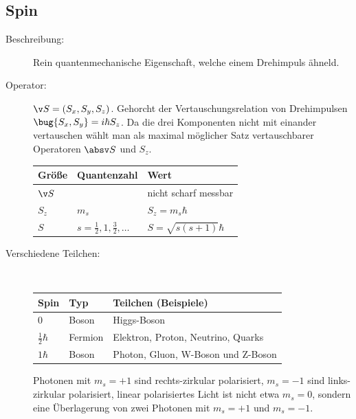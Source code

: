 \documentclass[twocolumn]{summery_4.1}
\begin{document}
\subsection{Spin}
\begin{description}
    \item[Beschreibung:] Rein quantenmechanische Eigenschaft, welche einem Drehimpuls ähneld. 
    \item[Operator:] \(\v S = (S_x,S_y,S_z)\). Gehorcht der Vertauschungsrelation von Drehimpulsen \(\bug{S_x,S_y} = i\hbar S_z \). Da die drei Komponenten nicht mit einander vertauschen wählt man als maximal möglicher Satz vertauschbarer Operatoren \(\absv S\) und \(S_z\).
    
    \begin{center}
        \begin{tabular}{@{}lll@{}}
            \toprule
            {\bf Größe} & {\bf Quantenzahl} & {\bf Wert}\\\midrule
            \(\v S\) & & nicht scharf messbar\\
            \(S_z\) & \(m_s\)  & \(S_z = m_s\hbar\)\\
            \(S\) & \(s=\frac12,1, \frac32,\dots \) & \(S = \sqrt{s(s+1)}\hbar\)\\\bottomrule
        \end{tabular}
    \end{center}

    \item[Verschiedene Teilchen:]\,\vspace{-1ex}
    
   \begin{center}
     \begin{tabular}{@{}lll@{}}
         \toprule
         {\bf Spin} & {\bf Typ} & {\bf Teilchen (Beispiele)}\\\midrule
         0 & Boson & Higgs-Boson \\
         \(\frac 12 \hbar\) & Fermion & Elektron, Proton, Neutrino, Quarks \\
         \(1\hbar\) & Boson & Photon, Gluon, W-Boson und Z-Boson \\\bottomrule
     \end{tabular}
   \end{center}\vspace{-1ex}
    Photonen mit \(m_s=+1\) sind rechts-zirkular polarisiert, \(m_s=-1\) sind links-zirkular polarisiert, linear polarisiertes Licht ist nicht etwa \(m_s=0\), sondern eine Überlagerung von zwei Photonen mit \(m_s=+1\) und \(m_s=-1\).
\end{description}
\end{document}
